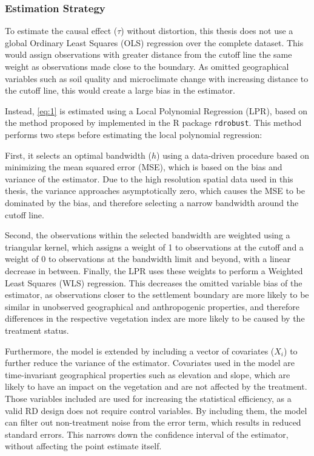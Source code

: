 \subsubsection{Estimation Strategy}
\label{subsubsec:methods_estimation_strategy}

To estimate the causal effect ($\tau$) without distortion, this thesis does not use a global Ordinary Least Squares (OLS) regression over the complete dataset.
This would assign observations with greater distance from the cutoff line the same weight as observations made close to the boundary.
As omitted geographical variables such as soil quality and microclimate change with increasing distance to the cutoff line, this would create a large bias in the estimator.

Instead, \cref{eq:1} is estimated using a Local Polynomial Regression (LPR), based on the method proposed by \cite{calonicoRdrobustPackageRobust2015} implemented in the R package \texttt{rdrobust}.
This  method performs two steps before estimating the local polynomial regression:

First, it selects an optimal bandwidth ($h$) using a data-driven procedure based on minimizing the mean squared error (MSE), which is based on the bias and variance of the estimator.
Due to the high resolution spatial data used in this thesis, the variance approaches asymptotically zero, which causes the MSE to be dominated by the bias, and therefore selecting a narrow bandwidth around the cutoff line.

Second, the observations within the selected bandwidth are weighted using a triangular kernel,
which assigns a weight of 1 to observations at the cutoff and a weight of 0 to observations at the bandwidth limit and beyond, with a linear decrease in between.
Finally, the LPR uses these weights to perform a Weighted Least Squares (WLS) regression.
This decreases the omitted variable bias of the estimator, as observations closer to the settlement boundary are more likely to be similar in unobserved geographical and anthropogenic properties,
and therefore differences in the respective vegetation index are more likely to be caused by the treatment status.

Furthermore, the model is extended by including a vector of covariates ($X_i$) to further reduce the variance of the estimator.
Covariates used in the model are time-invariant geographical properties such as elevation and slope, which are likely to have an impact on the vegetation and are not affected by the treatment.
Those variables included are used for increasing the statistical efficiency, as a valid RD design does not require control variables.
By including them, the model can filter out non-treatment noise from the error term, which results in reduced standard errors.
This narrows down the confidence interval of the estimator, without affecting the point estimate itself.

